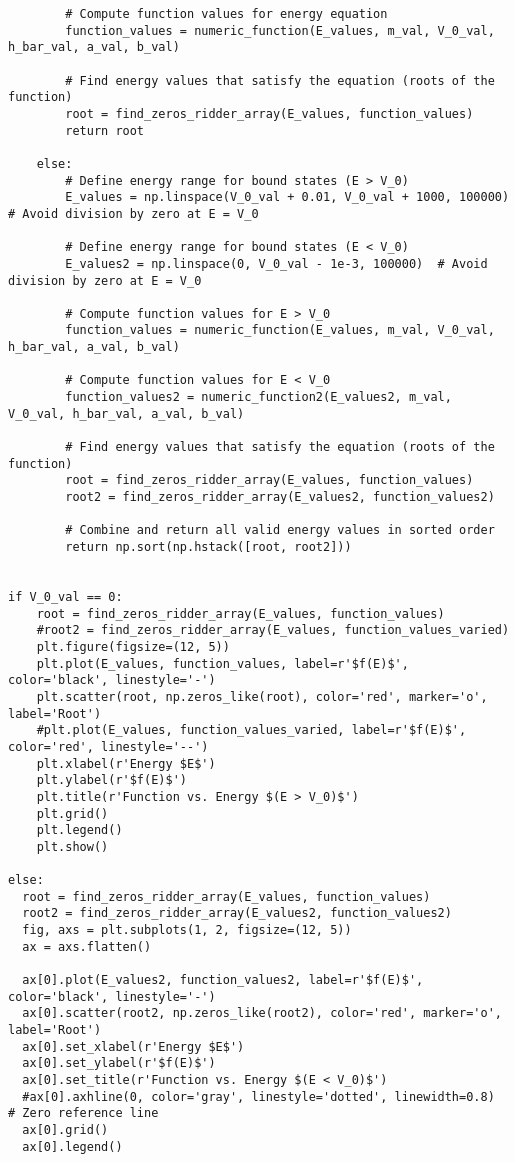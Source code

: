 \documentclass[11pt]{article}
\begin{document}
\begin{verbatim}
        # Compute function values for energy equation
        function_values = numeric_function(E_values, m_val, V_0_val, h_bar_val, a_val, b_val)

        # Find energy values that satisfy the equation (roots of the function)
        root = find_zeros_ridder_array(E_values, function_values)
        return root

    else:
        # Define energy range for bound states (E > V_0)
        E_values = np.linspace(V_0_val + 0.01, V_0_val + 1000, 100000)  # Avoid division by zero at E = V_0

        # Define energy range for bound states (E < V_0)
        E_values2 = np.linspace(0, V_0_val - 1e-3, 100000)  # Avoid division by zero at E = V_0

        # Compute function values for E > V_0
        function_values = numeric_function(E_values, m_val, V_0_val, h_bar_val, a_val, b_val)

        # Compute function values for E < V_0
        function_values2 = numeric_function2(E_values2, m_val, V_0_val, h_bar_val, a_val, b_val)

        # Find energy values that satisfy the equation (roots of the function)
        root = find_zeros_ridder_array(E_values, function_values)
        root2 = find_zeros_ridder_array(E_values2, function_values2)

        # Combine and return all valid energy values in sorted order
        return np.sort(np.hstack([root, root2]))


if V_0_val == 0:
    root = find_zeros_ridder_array(E_values, function_values)
    #root2 = find_zeros_ridder_array(E_values, function_values_varied)
    plt.figure(figsize=(12, 5))
    plt.plot(E_values, function_values, label=r'$f(E)$', color='black', linestyle='-')
    plt.scatter(root, np.zeros_like(root), color='red', marker='o', label='Root')
    #plt.plot(E_values, function_values_varied, label=r'$f(E)$', color='red', linestyle='--')
    plt.xlabel(r'Energy $E$')
    plt.ylabel(r'$f(E)$')
    plt.title(r'Function vs. Energy $(E > V_0)$')
    plt.grid()
    plt.legend()
    plt.show()

else:
  root = find_zeros_ridder_array(E_values, function_values)
  root2 = find_zeros_ridder_array(E_values2, function_values2)
  fig, axs = plt.subplots(1, 2, figsize=(12, 5))
  ax = axs.flatten()

  ax[0].plot(E_values2, function_values2, label=r'$f(E)$', color='black', linestyle='-')
  ax[0].scatter(root2, np.zeros_like(root2), color='red', marker='o', label='Root')
  ax[0].set_xlabel(r'Energy $E$')
  ax[0].set_ylabel(r'$f(E)$')
  ax[0].set_title(r'Function vs. Energy $(E < V_0)$')
  #ax[0].axhline(0, color='gray', linestyle='dotted', linewidth=0.8)  # Zero reference line
  ax[0].grid()
  ax[0].legend()


\end{verbatim}
\end{document}
